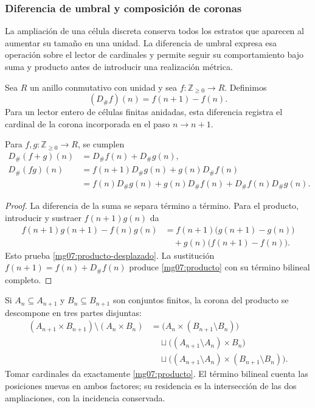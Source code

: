 \subsubsection{Diferencia de umbral y composición de coronas}
\label{mg07:umbral}

La ampliación de una célula discreta conserva todos los estratos que
aparecen al aumentar su tamaño en una unidad. La diferencia de umbral
expresa esa operación sobre el lector de cardinales y permite seguir
su comportamiento bajo suma y producto antes de introducir una
realización métrica.

\begin{definition}
Sea \(R\) un anillo conmutativo con unidad y sea
\(f:\mathbb Z_{\geq0}\to R\). Definimos
\begin{equation}
 (D_\#f)(n)=f(n+1)-f(n).
 \label{mg07:definicion}
\end{equation}
Para un lector entero de células finitas anidadas, esta diferencia
registra el cardinal de la corona incorporada en el paso \(n\to n+1\).
\end{definition}

\begin{proposition}
Para \(f,g:\mathbb Z_{\geq0}\to R\), se cumplen
\begin{align}
 D_\#(f+g)(n)&=D_\#f(n)+D_\#g(n),
 \label{mg07:aditividad}\\
 D_\#(fg)(n)&=f(n+1)D_\#g(n)+g(n)D_\#f(n)
 \label{mg07:producto-desplazado}\\
 &=f(n)D_\#g(n)+g(n)D_\#f(n)
   +D_\#f(n)D_\#g(n).
 \label{mg07:producto}
\end{align}
\end{proposition}

\begin{proof}
La diferencia de la suma se separa término a término. Para el producto,
introducir y sustraer \(f(n+1)g(n)\) da
\[
 \begin{split}
 f(n+1)g(n+1)-f(n)g(n)
 &=f(n+1)\bigl(g(n+1)-g(n)\bigr)\\
 &\quad+g(n)\bigl(f(n+1)-f(n)\bigr).
 \end{split}
\]
Esto prueba \eqref{mg07:producto-desplazado}. La sustitución
\(f(n+1)=f(n)+D_\#f(n)\) produce
\eqref{mg07:producto} con su término bilineal completo.
\end{proof}

Si \(A_n\subseteq A_{n+1}\) y \(B_n\subseteq B_{n+1}\) son
conjuntos finitos, la corona del producto se descompone en tres partes
disjuntas:
\[
 \begin{split}
 (A_{n+1}\times B_{n+1})\setminus(A_n\times B_n)
 &=\bigl(A_n\times(B_{n+1}\setminus B_n)\bigr)\\
 &\quad\sqcup\bigl((A_{n+1}\setminus A_n)\times B_n\bigr)\\
 &\quad\sqcup\bigl((A_{n+1}\setminus A_n)
                 \times(B_{n+1}\setminus B_n)\bigr).
 \end{split}
\]
Tomar cardinales da exactamente \eqref{mg07:producto}. El término
bilineal cuenta las posiciones nuevas en ambos factores; su residencia
es la intersección de las dos ampliaciones, con la incidencia conservada.

